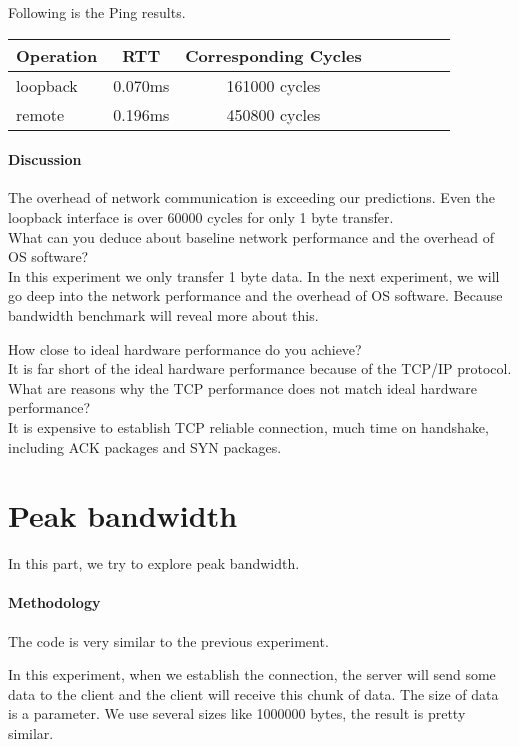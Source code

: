Following is the Ping results.
\begin{center}
\begin{tabular}{l*{6}{c}r}
Operation       &  RTT & Corresponding Cycles\\
\hline
loopback & 0.070ms & 161000 cycles\\
remote & 0.196ms &  450800 cycles\\
\end{tabular}
\end{center}

\paragraph{Discussion}
The overhead of network communication is exceeding our predictions. Even the loopback interface is over 60000 cycles for only 1 byte transfer. \\


What can you deduce about baseline network performance and the overhead of OS software?  \\
In this experiment we only transfer 1 byte data. In the next experiment, we will go deep into the network performance and the overhead of OS software. Because bandwidth benchmark will reveal more about this.

How close to ideal hardware performance do you achieve? \\ 
It is far short of the ideal hardware performance because of the TCP/IP protocol.\\


What are reasons why the TCP performance does not match ideal hardware performance?  \\
It is expensive to establish TCP reliable connection, much time on handshake, including ACK packages and SYN packages.

\section{Peak bandwidth}
In this part, we try to explore peak bandwidth.

\paragraph{Methodology}
The code is very similar to the previous experiment.

In this experiment, when we establish the connection, the server will send some data to the client and the client will receive this chunk of data. The size of data is a parameter. We use several sizes like 1000000 bytes, the result is pretty similar.

